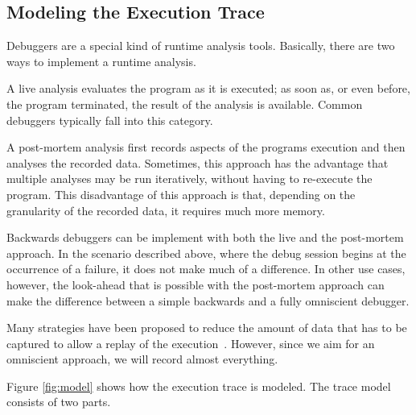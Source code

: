 \subsection{Modeling the Execution Trace}

Debuggers are a special kind of runtime analysis tools.
Basically, there are two ways to implement a runtime analysis.

A live analysis evaluates the program as it is executed; as soon as, or even before, the program terminated, the result of the analysis is available.
Common debuggers typically fall into this category.

A post-mortem analysis first records aspects of the programs execution and then analyses the recorded data.
Sometimes, this approach has the advantage that multiple analyses may be run iteratively, without having to re-execute the program.
This disadvantage of this approach is that, depending on the granularity of the recorded data, it requires much more memory.

Backwards debuggers can be implement with both the live and the post-mortem approach.
In the scenario described above, where the debug session begins at the occurrence of a failure, it does not make much of a difference.
In other use cases, however, the look-ahead that is possible with the post-mortem approach can make the difference between a simple backwards and a fully omniscient debugger.

Many strategies have been proposed to reduce the amount of data that has to be captured to allow a replay of the execution~\cite{pothier07:scalable_omniscient_debugging, lienhard08:practical_object-oriented_back-in-time_debugging}.
However, since we aim for an omniscient approach, we will record almost everything.

Figure \ref{fig:model} shows how the execution trace is modeled.
The trace model consists of two parts.


